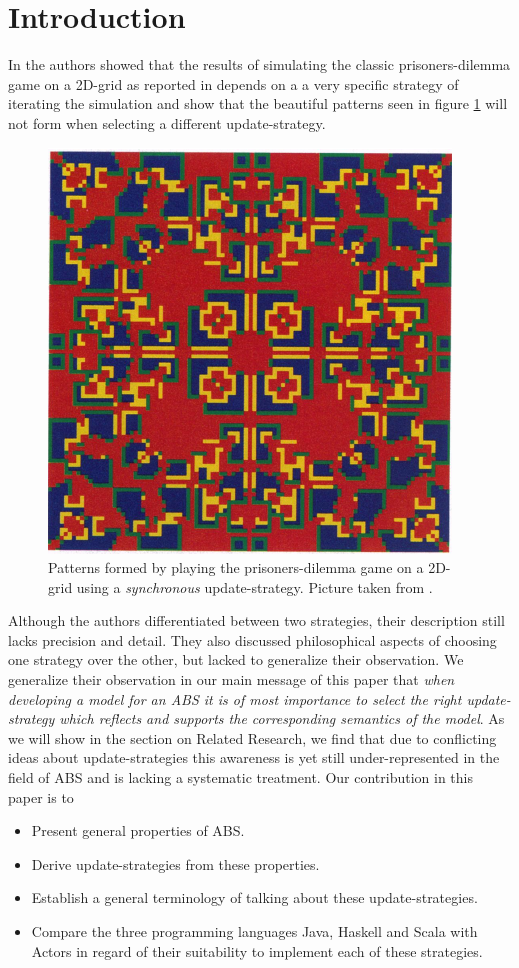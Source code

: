 \section{Introduction}
In \cite{huberman_evolutionary_1993} the authors showed that the results of simulating the classic prisoners-dilemma game on a 2D-grid as reported in \cite{nowak_evolutionary_1992} depends on a a very specific strategy of iterating the simulation and show that the beautiful patterns seen in figure \ref{fig:sync_patterns} will not form when selecting a different update-strategy.

\begin{figure}[H]
	\centering
  \includegraphics[width=.4\textwidth, angle=0]{./fig/sync_patterns.png}
	\caption{Patterns formed by playing the prisoners-dilemma game on a 2D-grid using a \textit{synchronous} update-strategy. Picture taken from \cite{huberman_evolutionary_1993}.}
	\label{fig:sync_patterns}
\end{figure}

Although the authors differentiated between two strategies, their description still lacks precision and detail. They also discussed philosophical aspects of choosing one strategy over the other, but lacked to generalize their observation. We generalize their observation in our main message of this paper that \textit{when developing a model for an ABS it is of most importance to select the right update-strategy which reflects and supports the corresponding semantics of the model}. As we will show in the section on Related Research, we find that due to conflicting ideas about update-strategies this awareness is yet still under-represented in the field of ABS and is lacking a systematic treatment. Our contribution in this paper is to
\begin{itemize}
	\item Present general properties of ABS.
	\item Derive update-strategies from these properties.
	\item Establish a general terminology of talking about these update-strategies.
	\item Compare the three programming languages Java, Haskell and Scala with Actors in regard of their suitability to implement each of these strategies.
\end{itemize}

